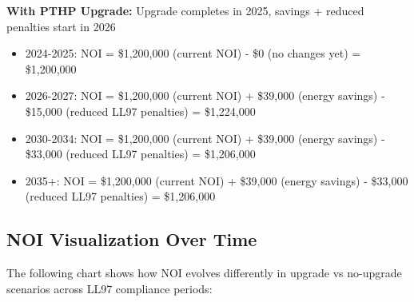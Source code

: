 \documentclass{article}
\begin{document}
\textbf{With PTHP Upgrade:} Upgrade completes in 2025, savings + reduced penalties start in 2026
\begin{itemize}
    \item 2024-2025: NOI = \$1,200,000 (current NOI) - \$0 (no changes yet) = \$1,200,000
    \item 2026-2027: NOI = \$1,200,000 (current NOI) + \$39,000 (energy savings) - \$15,000 (reduced LL97 penalties) = \$1,224,000
    \item 2030-2034: NOI = \$1,200,000 (current NOI) + \$39,000 (energy savings) - \$33,000 (reduced LL97 penalties) = \$1,206,000  
    \item 2035+: NOI = \$1,200,000 (current NOI) + \$39,000 (energy savings) - \$33,000 (reduced LL97 penalties) = \$1,206,000
\end{itemize}

\subsection{NOI Visualization Over Time}

The following chart shows how NOI evolves differently in upgrade vs no-upgrade scenarios across LL97 compliance periods:
\end{document}
